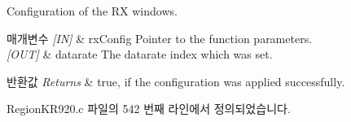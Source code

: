 Configuration of the RX windows. 


\begin{DoxyParams}{매개변수}
{\em \mbox{[}\+I\+N\mbox{]}} & rx\+Config Pointer to the function parameters.\\
\hline
{\em \mbox{[}\+O\+U\+T\mbox{]}} & datarate The datarate index which was set.\\
\hline
\end{DoxyParams}

\begin{DoxyRetVals}{반환값}
{\em Returns} & true, if the configuration was applied successfully. \\
\hline
\end{DoxyRetVals}


Region\+K\+R920.\+c 파일의 542 번째 라인에서 정의되었습니다.


